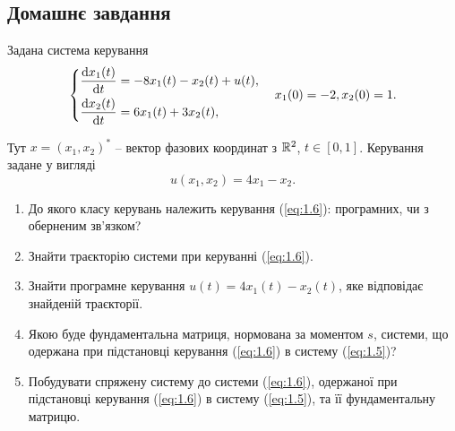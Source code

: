 \subsection{Домашнє завдання}

\begin{problem}
	Задана система керування 
	\begin{equation}
		\label{eq:1.5}
		\left\{
			\begin{aligned}
				\dfrac{\mathop{}\!\mathrm{d} x_1(t)}{\mathop{}\!\mathrm{d} t} &= -8x_1(t)  -x_2(t) + u(t),\\
				\dfrac{\mathop{}\!\mathrm{d} x_2(t)}{\mathop{}\!\mathrm{d} t} &= 6x_1(t) + 3x_2(t),
			\end{aligned}
		\right.
		\quad
		x_1(0) = -2, x_2(0) = 1.
	\end{equation}

	Тут $ x =(x_1, x_2)^*$ -- вектор фазових координат з $\mathbb{R}^2$, $t \in [0, 1]$. Керування задане у вигляді
	\begin{equation}
		\label{eq:1.6}
		u(x_1, x_2) = 4x_1 - x_2.
	\end{equation}

	\begin{enumerate}
		\item До якого класу керувань належить керування (\ref{eq:1.6}): програмних, чи з оберненим зв'язком?
		\item Знайти траєкторію системи при керуванні (\ref{eq:1.6}).
		\item Знайти програмне керування $u(t) = 4x_1(t) - x_2(t)$, яке відповідає знайденій траєкторії.
		\item Якою буде фундаментальна матриця, нормована за моментом $s$, системи, що одержана при підстановці керування (\ref{eq:1.6}) в систему (\ref{eq:1.5})?
		\item Побудувати спряжену систему до системи (\ref{eq:1.6}), одержаної при підстановці керування (\ref{eq:1.6}) в систему (\ref{eq:1.5}), та її фундаментальну матрицю.
	\end{enumerate}
\end{problem}

